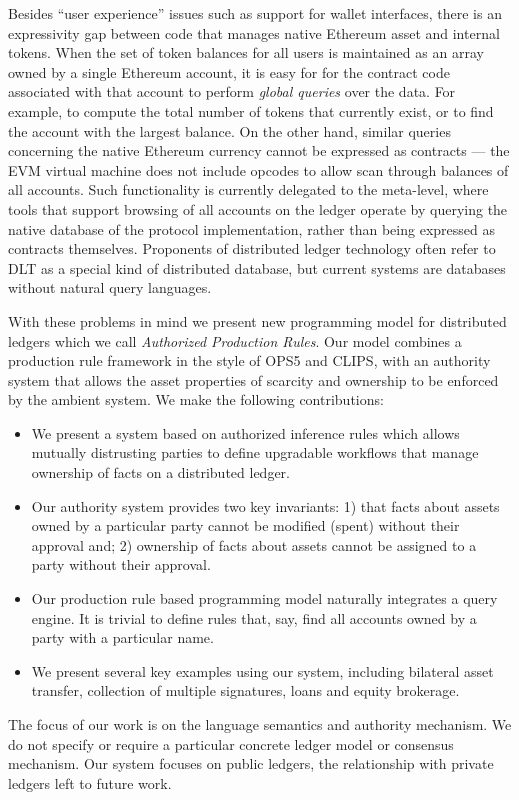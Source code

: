 Besides ``user experience'' issues such as support for wallet interfaces, there is an expressivity gap between code that manages native Ethereum asset and internal tokens. When the set of token balances for all users is maintained as an array owned by a single Ethereum account, it is easy for for the contract code associated with that account to perform \emph{global queries} over the data. For example, to compute the total number of tokens that currently exist, or to find the account with the largest balance. On the other hand, similar queries concerning the native Ethereum currency cannot be expressed as contracts --- the EVM virtual machine does not include opcodes to allow scan through balances of all accounts. Such functionality is currently delegated to the meta-level, where tools that support browsing of all accounts on the ledger operate by querying the native database of the protocol implementation, rather than being expressed as contracts themselves. Proponents of distributed ledger technology often refer to DLT as a special kind of distributed database, but current systems are databases without natural query languages.

With these problems in mind we present new programming model for distributed ledgers which we call \emph{Authorized Production Rules}. Our model combines a production rule framework in the style of OPS5 and CLIPS, with an authority system that allows the asset properties of scarcity and ownership to be enforced by the ambient system. We make the following contributions:

\begin{itemize}
\item We present a system based on authorized inference rules which allows mutually distrusting parties to define upgradable workflows that manage ownership of facts on a distributed ledger.

\item Our authority system provides two key invariants: 1) that facts about assets owned by a particular party cannot be modified (spent) without their approval and; 2) ownership of facts about assets cannot be assigned to a party without their approval.

\item Our production rule based programming model naturally integrates a query engine. It is trivial to define rules that, say, find all accounts owned by a party with a particular name.

\item We present several key examples using our system, including bilateral asset transfer, collection of multiple signatures, loans and equity brokerage.
\end{itemize}

The focus of our work is on the language semantics and authority mechanism. We do not specify or require a particular concrete ledger model or consensus mechanism. Our system focuses on public ledgers, the relationship with private ledgers left to future work.

